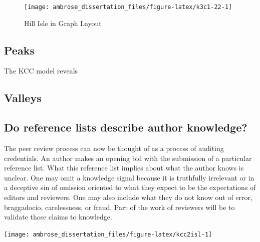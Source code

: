 \documentclass[]{book}
\theoremstyle{definition}
\theoremstyle{definition}
\theoremstyle{definition}
\theoremstyle{remark}
\begin{document}
\begin{figure}

{\centering \texttt{[image: ambrose\_dissertation\_files/figure-latex/k3c1-22-1]} 

}

\caption{Hill Isle in Graph Layout}\label{fig:k3c1-22}
\end{figure}

\hypertarget{peaks}{%
\subsection{Peaks}\label{peaks}}

The KCC model reveals

\hypertarget{valleys}{%
\subsection{Valleys}\label{valleys}}

\hypertarget{do-reference-lists-describe-author-knowledge}{%
\subsection{Do reference lists describe author
knowledge?}\label{do-reference-lists-describe-author-knowledge}}

The peer review process can now be thought of as a process of auditing
credentials. An author makes an opening bid with the submission of a
particular reference list. What this reference list implies about what
the author knows is unclear. One may omit a knowledge signal because it
is truthfully irrelevant or in a deceptive sin of omission oriented to
what they expect to be the expectations of editors and reviewers. One
may also include what they do not know out of error, braggadocio,
carelessness, or fraud. Part of the work of reviewers will be to
validate those claims to knowledge.

\begin{center}\texttt{[image: ambrose\_dissertation\_files/figure-latex/kcc2isl-1]} \end{center}


\end{document}
